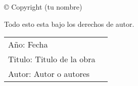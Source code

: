 \newpage
\thispagestyle{empty}
\begin{flushleft} © Copyright (tu nombre)

Todo esto esta bajo los derechos de autor. 
\vspace{16mm}

\begin{tabular}{@{}lp{\textwidth-10em}}
Año: Fecha  \\
Titulo: Titulo de la obra\\
Autor: Autor o autores\\
\end{tabular}
\end{flushleft}